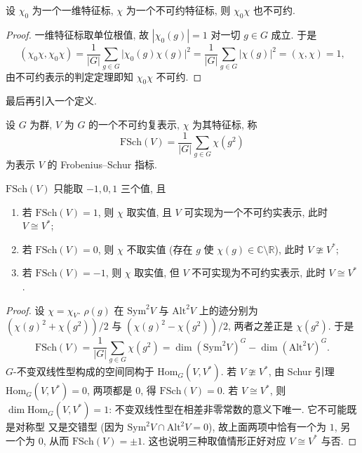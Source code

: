 \begin{theorem}\label{thm:one-dim-times-irreducible}
设 $\chi_0$ 为一个一维特征标, $\chi$ 为一个不可约特征标, 则 $\chi_0\chi$ 也不可约.
\end{theorem}

\begin{proof}
一维特征标取单位根值, 故 $|\chi_0(g)|=1$ 对一切 $g\in G$ 成立. 于是
\[
  (\chi_0\chi,\chi_0\chi)
  =\frac{1}{|G|}\sum_{g\in G}\bigl|\chi_0(g)\chi(g)\bigr|^2
  =\frac{1}{|G|}\sum_{g\in G}\bigl|\chi(g)\bigr|^2=(\chi,\chi)=1,
\]
由不可约表示的判定定理即知 $\chi_0\chi$ 不可约.
\end{proof}

最后再引入一个定义.

\begin{definition}\label{def:fs-indicator}
设 $G$ 为群, $V$ 为 $G$ 的一个不可约复表示, $\chi$ 为其特征标, 称
\[
  \mathrm{FSch}(V)=\frac{1}{|G|}\sum_{g\in G}\chi(g^2)
\]
为表示 $V$ 的 Frobenius--Schur 指标.
\end{definition}

\begin{theorem}\label{thm:fsch-values}
$\mathrm{FSch}(V)$ 只能取 $-1,0,1$ 三个值, 且
\begin{enumerate}
  \item 若 $\mathrm{FSch}(V)=1$, 则 $\chi$ 取实值, 且 $V$ 可实现为一个不可约实表示,
        此时 $V\cong V^*$;
  \item 若 $\mathrm{FSch}(V)=0$, 则 $\chi$ 不取实值 (存在 $g$ 使 $\chi(g)\in\mathbb{C}\setminus\mathbb{R}$),
        此时 $V\ncong V^*$;
  \item 若 $\mathrm{FSch}(V)=-1$, 则 $\chi$ 取实值, 但 $V$ 不可实现为不可约实表示,
        此时 $V\cong V^*$.
\end{enumerate}
\end{theorem}

\begin{proof}
设 $\chi=\chi_V$. $\rho(g)$ 在 $\mathrm{Sym}^2V$ 与 $\mathrm{Alt}^2V$ 上的迹分别为
$(\chi(g)^2+\chi(g^2))/2$ 与 $(\chi(g)^2-\chi(g^2))/2$, 两者之差正是 $\chi(g^2)$. 于是
\[
  \mathrm{FSch}(V)=\frac{1}{|G|}\sum_{g\in G}\chi(g^2)
  =\dim(\mathrm{Sym}^2V)^G-\dim(\mathrm{Alt}^2V)^G .
\]
$G$-不变双线性型构成的空间同构于 $\mathrm{Hom}_G(V,V^*)$. 若 $V\ncong V^*$, 由 Schur 引理
$\mathrm{Hom}_G(V,V^*)=0$, 两项都是 $0$, 得 $\mathrm{FSch}(V)=0$. 若 $V\cong V^*$, 则
$\dim\mathrm{Hom}_G(V,V^*)=1$: 不变双线性型在相差非零常数的意义下唯一. 它不可能既是对称型
又是交错型 (因为 $\mathrm{Sym}^2V\cap\mathrm{Alt}^2V=0$), 故上面两项中恰有一个为 $1$, 另一个为 $0$,
从而 $\mathrm{FSch}(V)=\pm1$. 这也说明三种取值情形正好对应 $V\cong V^*$ 与否.
\end{proof}

